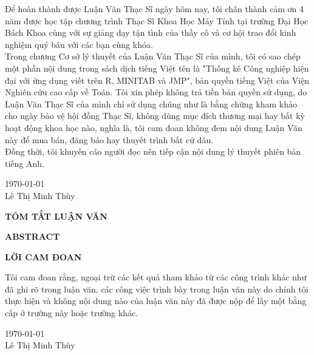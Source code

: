 \documentclass[a4paper, 13pt]{report}
\begin{document}
Để hoàn thành được Luận Văn Thạc Sĩ ngày hôm nay, tôi chân thành cảm ơn 4 năm được học tập chương trình Thạc Sĩ Khoa Học Máy Tính tại trường Đại Học Bách Khoa cùng với sự giảng dạy tận tình của thầy cô và cơ hội trao đổi kinh nghiệm quý báu với các bạn cùng khóa.\\
Trong chương Cơ sở lý thuyết của Luận Văn Thạc Sĩ của mình, tôi có sao chép một phần nội dung trong sách dịch tiếng Việt tên là "Thống kê Công nghiệp hiện đại với ứng dụng viết trên R, MINITAB và JMP", bản quyền tiếng Việt của Viện Nghiên cứu cao cấp về Toán. Tôi xin phép không trả tiền bản quyền sử dụng, do Luận Văn Thạc Sĩ của mình chỉ sử dụng chúng như là bằng chứng kham khảo cho ngày bảo vệ hội đồng Thạc Sĩ, không dùng mục đích thương mại hay bất kỳ hoạt động khoa học nào, nghĩa là, tôi cam đoan không đem nội dung Luận Văn này để mua bán, đăng báo hay thuyết trình bất cứ đâu.\\
Đồng thời, tôi khuyến cáo người đọc nên tiếp cận nội dung lý thuyết phiên bản tiếng Anh.
\begin{flushright}
\today\\
Lê Thị Minh Thùy
\end{flushright}
\pagebreak
\begin{center}{\fontsize{16pt}{1}\selectfont \textbf{TÓM TẮT LUẬN VĂN}}\\\end{center}
\pagebreak
\begin{center}{\fontsize{16pt}{1}\selectfont \textbf{ABSTRACT}}\\\end{center}
\pagebreak
\begin{center}{\fontsize{16pt}{1}\selectfont \textbf{LỜI CAM ĐOAN}}\\\end{center}
Tôi cam đoan rằng, ngoại trừ các kết quả tham khảo từ các công trình khác như đã ghi rõ trong luận văn, các công việc trình bày trong luận văn này do chính tôi thực hiện và không nội dung nào của luận văn này đã được nộp để lấy một bằng cấp ở trường này hoặc trường khác.\\
\begin{flushright}
\today\\
Lê Thị Minh Thùy
\end{flushright}

\tableofcontents
\pagebreak
{}
\end{document}
